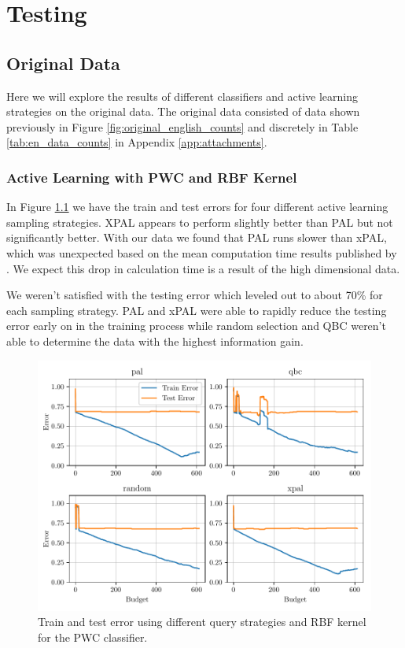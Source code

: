 \chapter{Testing}

\section{Original Data}

Here we will explore the results of different classifiers and active learning strategies on the original data. The original data consisted of data shown previously in Figure \ref{fig:original_english_counts} and discretely in Table \ref{tab:en_data_counts} in Appendix \ref{app:attachments}. 

\subsection{Active Learning with PWC and RBF Kernel}

In Figure \ref{fig:plot_all_results_rbf} we have the train and test errors for four different active learning sampling strategies. XPAL appears to perform slightly better than PAL but not significantly better. With our data we found that PAL runs slower than xPAL, which was unexpected based on the mean computation time results published by \cite{kottke2021toward}. We expect this drop in calculation time is a result of the high dimensional data.

We weren't satisfied with the testing error which leveled out to about 70\% for each sampling strategy. PAL and xPAL were able to rapidly reduce the testing error early on in the training process while random selection and QBC weren't able to determine the data with the highest information gain. 

\begin{figure}[ht]
  \centering
  \includegraphics[width=\textwidth]{../img/plot_all_results_rbf.pdf}
  \caption{Train and test error using different query strategies and RBF kernel for the PWC classifier.}
  \label{fig:plot_all_results_rbf}
\end{figure}

